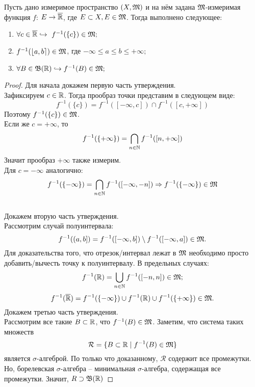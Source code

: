 \begin{corollary}
    Пусть дано измеримое пространство $(X, \mathfrak{M})$ и на нём задана $\mathfrak{M}$-измеримая функция $f$: $E \rightarrow \overline{\mathbb{R}}$, где $E \subset X, E \in \mathfrak{M}$.
    Тогда выполнено следующее:
    \begin{enumerate}
        \item $\forall c \in \overline{\mathbb{R}} \hookrightarrow \  f^{-1}(\{c\}) \in \mathfrak{M};$
        \item $f^{-1}(\lfloor a, b \rceil) \in \mathfrak{M}$, где $-\infty \leq a \leq b \leq +\infty;$
        \item $\forall B \in \mathfrak{B}(\mathbb{R}) \hookrightarrow f^{-1}(B) \in \mathfrak{M};$
    \end{enumerate}
\end{corollary}
\begin{proof}
    Для начала докажем первую часть утверждения. \\
    Зафиксируем $c \in \mathbb{R}$. Тогда прообраз точки представим в следующем виде: \[f^{-1}(\{c\}) = f^{-1}([-\infty, c]) \cap f^{-1}([c, +\infty])\]
    Поэтому $f^{-1}(\{c\}) \in \mathfrak{M}$. \\
    Если же $c = +\infty$, то \[f^{-1}(\{+ \infty\}) = \bigcap\limits_{n \in \mathbb{N}} f^{-1}([n, +\infty])\] Значит прообраз $+\infty$ также измерим. \\
    Для $c = -\infty$ аналогично: \[f^{-1}(\{- \infty\}) = \bigcap\limits_{n \in \mathbb{N}} f^{-1}([-\infty, -n]) \Rightarrow f^{-1}(\{-\infty\}) \in \mathfrak{M}\] \\
    Докажем вторую часть утверждения. \\
    Рассмотрим случай полуинтервала: \[f^{-1}((a, b]) = f^{-1}([-\infty, b]) \setminus f^{-1}([-\infty, a]) \in \mathfrak{M}.\] Для доказательства того, что отрезок/интервал лежат в $\mathfrak{M}$ необходимо просто добавить/вычесть точку к полуинтервалу. В предельных случаях: \\
    \[f^{-1}(\mathbb{R}) = \bigcup\limits_{n \in \mathbb{N}} f^{-1}([-n, n]) \in \mathfrak{M};\]
    \[f^{-1}(\overline{\mathbb{R}}) = f^{-1}(\{-\infty\}) \cup f^{-1}(\mathbb{R}) \cup f^{-1}(\{+\infty\}) \in \mathfrak{M}.\]
    Докажем третью часть утверждения. \\
    Рассмотрим все такие $B \subset \mathbb{R}$, что $f^{-1}(B) \in \mathfrak{M}$. Заметим, что система таких множеств \[\mathcal{R} = \{B \subset \mathbb{R} \mid f^{-1}(B) \in \mathfrak{M}\}\] является $\sigma$-алгеброй. По только что доказанному, $\mathcal{R}$ содержит все промежутки. Но, борелевская $\sigma$-алгебра -- минимальная $\sigma$-алгебра, содержащая все промежутки. Значит, $R \supset \mathfrak{B}(\mathbb{R})$
\end{proof}


